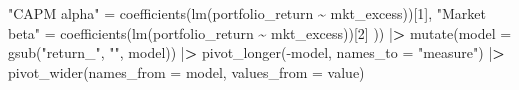 \documentclass[
]{krantz}
\newenvironment{Shaded}{\begin{snugshade}}{\end{snugshade}}
\newcommand{\AttributeTok}[1]{\textcolor[rgb]{0.61,0.61,0.61}{#1}}
\newcommand{\DecValTok}[1]{\textcolor[rgb]{0.06,0.06,0.06}{#1}}
\newcommand{\ErrorTok}[1]{\textcolor[rgb]{0.14,0.14,0.14}{\textbf{#1}}}
\newcommand{\FunctionTok}[1]{\textcolor[rgb]{0,0,0}{#1}}
\newcommand{\NormalTok}[1]{#1}
\newcommand{\OtherTok}[1]{\textcolor[rgb]{0.37,0.37,0.37}{#1}}
\newcommand{\SpecialCharTok}[1]{\textcolor[rgb]{0,0,0}{#1}}
\newcommand{\StringTok}[1]{\textcolor[rgb]{0.5,0.5,0.5}{#1}}
\begin{document}
\begin{Shaded}
\begin{Highlighting}[]
      \StringTok{"CAPM alpha"} \OtherTok{=} \FunctionTok{coefficients}\NormalTok{(}\FunctionTok{lm}\NormalTok{(portfolio\_return }\SpecialCharTok{\textasciitilde{}}\NormalTok{ mkt\_excess))[}\DecValTok{1}\NormalTok{],}
      \StringTok{"Market beta"} \OtherTok{=} \FunctionTok{coefficients}\NormalTok{(}\FunctionTok{lm}\NormalTok{(portfolio\_return }\SpecialCharTok{\textasciitilde{}}\NormalTok{ mkt\_excess))[}\DecValTok{2}\NormalTok{]}
\NormalTok{    )) }\SpecialCharTok{|}\ErrorTok{\textgreater{}}
    \FunctionTok{mutate}\NormalTok{(}\AttributeTok{model =} \FunctionTok{gsub}\NormalTok{(}\StringTok{"return\_"}\NormalTok{, }\StringTok{""}\NormalTok{, model)) }\SpecialCharTok{|}\ErrorTok{\textgreater{}}
    \FunctionTok{pivot\_longer}\NormalTok{(}\SpecialCharTok{{-}}\NormalTok{model, }\AttributeTok{names\_to =} \StringTok{"measure"}\NormalTok{) }\SpecialCharTok{|}\ErrorTok{\textgreater{}}
    \FunctionTok{pivot\_wider}\NormalTok{(}\AttributeTok{names\_from =}\NormalTok{ model, }\AttributeTok{values\_from =}\NormalTok{ value)}


\end{Highlighting}
\end{Shaded}
\end{document}
